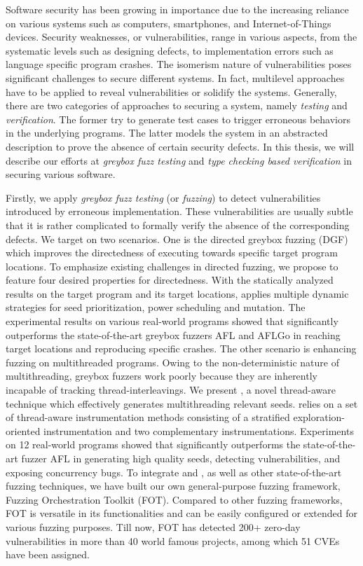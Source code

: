 Software security has been growing in importance due to the increasing reliance on various systems such as computers, smartphones, and Internet-of-Things devices. Security weaknesses, or vulnerabilities, range in various aspects, from the systematic levels such as designing defects, to implementation errors such as language specific program crashes. The isomerism nature of vulnerabilities poses significant challenges to secure different systems. In fact, multilevel approaches have to be applied to reveal vulnerabilities or solidify the systems. Generally, there are two categories of approaches to securing a system, namely \emph{testing} and \emph{verification}. The former try to generate test cases to trigger erroneous behaviors in the underlying programs. The latter models the system in an abstracted description to prove the absence of certain security defects.
  In this thesis, we will describe our efforts at \emph{greybox fuzz testing} and \emph{type checking based verification} in securing various software.

Firstly, we apply \emph{greybox fuzz testing} (or \emph{fuzzing}) to detect vulnerabilities introduced by erroneous implementation. These vulnerabilities are usually subtle that it is rather complicated to formally verify the absence of the corresponding defects. We target on two scenarios.
One is the directed greybox fuzzing (DGF) which improves the directedness of executing towards specific target program locations. To emphasize existing challenges in \mbox{directed} fuzzing, we propose \dFOT to feature four desired properties for directedness. With the statically analyzed results on the target program and its target locations, \dFOT applies multiple dynamic strategies for seed prioritization, power scheduling and \mbox{mutation}. The experimental results on various real-world \mbox{programs} showed that \dFOT significantly outperforms the state-of-the-art greybox fuzzers AFL and AFLGo in reaching target locations and reproducing specific crashes.
The other scenario is enhancing fuzzing on multithreaded programs. Owing to the non-deterministic nature of multithreading, greybox fuzzers work poorly because they are inherently incapable of tracking thread-interleavings. We present \mtfuzz, a novel thread-aware technique which effectively generates multithreading relevant seeds. \mtfuzz relies on a set of thread-aware instrumentation methods consisting of a stratified exploration-oriented instrumentation and two complementary instrumentations. Experiments on 12 real-world programs showed that \mtfuzz significantly outperforms the state-of-the-art fuzzer AFL in generating high quality seeds, detecting vulnerabilities, and exposing concurrency bugs.
To integrate \dFOT and \mtfuzz, as well as other state-of-the-art fuzzing techniques, we have built our own general-purpose fuzzing framework, Fuzzing Orchestration Toolkit (FOT). Compared to other fuzzing frameworks, FOT is versatile in its functionalities and can be easily configured or extended for various fuzzing purposes. Till now, FOT has detected 200+ zero-day vulnerabilities in more than 40 world famous projects, among which 51 CVEs have been assigned.

